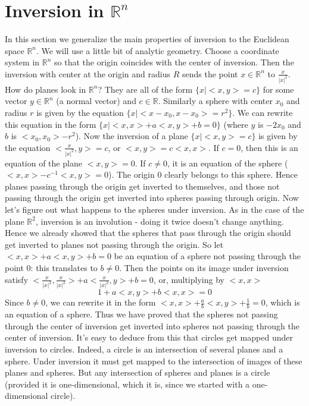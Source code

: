 \section{Inversion in $\mathbb{R}^n$}
In this section we generalize the main properties of inversion to the Euclidean space $\mathbb{R}^n$. We will use a little bit of analytic geometry.
Choose a coordinate system in $\mathbb{R}^n$ so that the origin coincides with the center of inversion. Then the inversion with center at the origin and radius $R$ sends the point $x\in \mathbb{R}^n$ to $\frac{x}{|x|^2}$.
How do planes look in $\mathbb{R}^n$? They are all of the form $\{x|<x,y>=c\}$ for some vector $y\in \mathbb{R}^n$ (a normal vector) and $c\in \mathbb{R}$. Similarly a sphere with center $x_0$ and radius $r$ is given by the equation $\{x|<x-x_0,x-x_0>=r^2\}$. We can rewrite this equation in the form $\{x| <x,x>+a<x,y>+b=0\}$ (where $y$ is $-2 x_0$ and $b$ is $<x_0,x_0>-r^2$).
Now the inversion of a plane $\{x|<x,y>=c\}$ is given by the equation $<\frac{x}{|x|^2},y>=c$, or $<x,y>=c<x,x>$. If $c=0$, then this is an equation of the plane $<x,y>=0$. If $c\neq 0$, it is an equation of the sphere ($<x,x>-c^{-1}<x,y>=0$). The origin $0$ clearly belongs to this sphere. Hence planes passing through the origin get inverted to themselves, and those not passing through the origin get inverted into spheres passing through origin.
Now let's figure out what happens to the spheres under inversion. As in the case of the plane $\mathbb{R}^2$, inversion is an involution - doing it twice doesn't change anything. Hence we already showed that the spheres that pass through the origin should get inverted to planes not passing through the origin. So let $<x,x>+a<x,y>+b=0$ be an equation of a sphere not passing through the point $0$: this translates to $b\neq 0$. Then the points on its image under inversion satisfy $<\frac{x}{|x|^2},\frac{x}{|x|^2}>+a<\frac{x}{|x|^2},y>+b=0$, or, multiplying by $<x,x>$ $$1+a<x,y>+b<x,x>=0$$ Since $b\neq 0$, we can rewrite it in the form $<x,x>+\frac{a}{b} <x,y>+\frac{1}{b}=0$, which is an equation of a sphere. Thus we have proved that the spheres not passing through the center of inversion get inverted into spheres not passing through the center of inversion.
It's easy to deduce from this that circles get mapped under inversion to circles. Indeed, a circle is an intersection of several planes and a sphere. Under inversion it must get mapped to the intersection of images of these planes and spheres. But any intersection of spheres and planes is a circle (provided it is one-dimensional, which it is, since we started with a one-dimensional circle).
